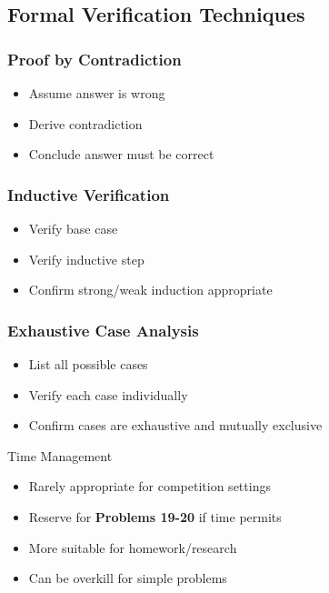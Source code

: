 \documentclass{article}
\newcommand{\problemrange}[1]{\textbf{Problems #1}}
\begin{document}
\subsection{Formal Verification Techniques}

\subsubsection{Proof by Contradiction}
\begin{itemize}
\item Assume answer is wrong
\item Derive contradiction
\item Conclude answer must be correct
\end{itemize}

\subsubsection{Inductive Verification}
\begin{itemize}
\item Verify base case
\item Verify inductive step
\item Confirm strong/weak induction appropriate
\end{itemize}

\subsubsection{Exhaustive Case Analysis}
\begin{itemize}
\item List all possible cases
\item Verify each case individually
\item Confirm cases are exhaustive and mutually exclusive
\end{itemize}

\begin{warningbox}{Time Management}
\begin{itemize}[nosep]
\item Rarely appropriate for competition settings
\item Reserve for \problemrange{19-20} if time permits
\item More suitable for homework/research
\item Can be overkill for simple problems
\end{itemize}
\end{warningbox}
\end{document}
